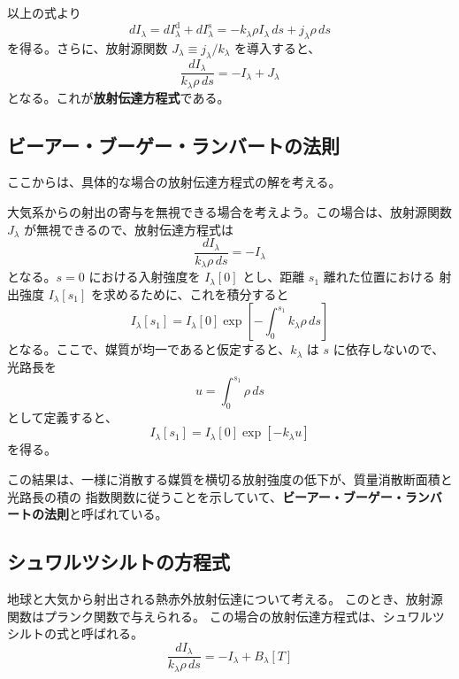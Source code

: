 \documentclass[article]{dennou777}
\newcommand{\hmemph}[1]{\textbf{#1}}
\begin{document}
以上の式より
\begin{equation}
	dI_\lambda=dI_\lambda^\mathrm{d}+dI_\lambda^\mathrm{s}
	=-k_\lambda\rho I_\lambda\,ds+j_\lambda\rho\,ds
\end{equation}
を得る。さらに、放射源関数 $J_\lambda\equiv j_\lambda/k_\lambda$ を導入すると、
\begin{equation}
	\frac{dI_\lambda}{k_\lambda\rho\,ds}=-I_\lambda+J_\lambda
\end{equation}
となる。これが\hmemph{放射伝達方程式}である。

\subsection{ビーアー・ブーゲー・ランバートの法則}
ここからは、具体的な場合の放射伝達方程式の解を考える。

大気系からの射出の寄与を無視できる場合を考えよう。この場合は、放射源関数 $J_\lambda$
が無視できるので、放射伝達方程式は
\begin{equation}
	\frac{dI_\lambda}{k_\lambda\rho\,ds}=-I_\lambda
\end{equation}
となる。$s=0$ における入射強度を $I_\lambda[0]$ とし、距離 $s_1$ 離れた位置における
射出強度 $I_\lambda[s_1]$ を求めるために、これを積分すると
\begin{equation}
	I_\lambda[s_1]=I_\lambda[0]\exp[-\int^{s_1}_0 k_\lambda\rho\,ds]
\end{equation}
となる。ここで、媒質が均一であると仮定すると、$k_\lambda$ は $s$ に依存しないので、光路長を
\begin{equation}
	u=\int^{s_1}_0\rho\,ds
\end{equation}
として定義すると、
\begin{equation}
	I_\lambda[s_1]=I_\lambda[0]\exp[-k_\lambda u]
\end{equation}
を得る。

この結果は、一様に消散する媒質を横切る放射強度の低下が、質量消散断面積と光路長の積の
指数関数に従うことを示していて、\hmemph{ビーアー・ブーゲー・ランバートの法則}と呼ばれている。


\subsection{シュワルツシルトの方程式}
地球と大気から射出される熱赤外放射伝達について考える。
このとき、放射源関数はプランク関数で与えられる。
この場合の放射伝達方程式は、シュワルツシルトの式と呼ばれる。
\begin{equation}
	\frac{dI_\lambda}{k_\lambda\rho\,ds}=-I_\lambda+B_\lambda[T]
\end{equation}
\end{document}
